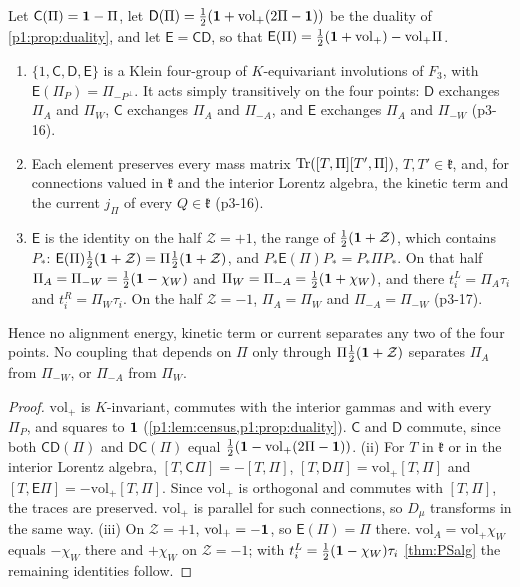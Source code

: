 \begin{proposition}
\label{p3:prop:klein}
Let $\mathsf C(\Pi)=\mathbf 1-\Pi$, let $\mathsf D(\Pi)=\tfrac12(\mathbf 1+\mathrm{vol}_+(2\Pi-\mathbf 1))$ be the duality of \cref{p1:prop:duality}, and let $\mathsf E=\mathsf C\mathsf D$, so
that $\mathsf E(\Pi)=\tfrac12(\mathbf 1+\mathrm{vol}_+)-\mathrm{vol}_+\Pi$.
\begin{enumerate}[label=(\roman*),leftmargin=2.2em]
\item $\{1,\mathsf C,\mathsf D,\mathsf E\}$ is a Klein four-group of $K$-equivariant involutions of $F_3$, with $\mathsf E(\Pi_P)=\Pi_{-P^\perp}$. It acts simply transitively on
the four points: $\mathsf D$ exchanges $\Pi_A$ and $\Pi_W$, $\mathsf C$ exchanges $\Pi_A$ and $\Pi_{-A}$, and $\mathsf E$ exchanges $\Pi_A$ and $\Pi_{-W}$ (p3-16).
\item Each element preserves every mass matrix $\operatorname{Tr}([T,\Pi][T',\Pi])$, $T,T'\in\mathfrak k$, and, for connections valued in $\mathfrak k$ and the interior Lorentz algebra, the
kinetic term and the current $j_\Pi$ of every $Q\in\mathfrak k$ (p3-16).
\item $\mathsf E$ is the identity on the half $\mathcal Z=+1$, the range of $\tfrac12(\mathbf 1+\mathcal Z)$, which contains $P_*$: $\mathsf E(\Pi)\tfrac12(\mathbf 1+\mathcal Z)=\Pi\tfrac12(\mathbf 1+\mathcal Z)$, and
$P_*\mathsf E(\Pi)P_*=P_*\Pi P_*$. On that half $\Pi_A=\Pi_{-W}=\tfrac12(\mathbf 1-\chi_W)$ and $\Pi_W=\Pi_{-A}=\tfrac12(\mathbf 1+\chi_W)$, and there $t^L_i=\Pi_A\tau_i$ and
$t^R_i=\Pi_W\tau_i$. On the half $\mathcal Z=-1$, $\Pi_A=\Pi_W$ and $\Pi_{-A}=\Pi_{-W}$ (p3-17).
\end{enumerate}
Hence no alignment energy, kinetic term or current separates any two of the four points. No coupling that depends on $\Pi$ only through $\Pi\tfrac12(\mathbf 1+\mathcal Z)$ separates
$\Pi_A$ from $\Pi_{-W}$, or $\Pi_{-A}$ from $\Pi_W$.
\end{proposition}

\begin{proof}
$\mathrm{vol}_+$ is $K$-invariant, commutes with the interior gammas and with every $\Pi_P$, and squares to $\mathbf 1$ (\cref{p1:lem:census,p1:prop:duality}). $\mathsf C$ and
$\mathsf D$ commute, since both $\mathsf C\mathsf D(\Pi)$ and $\mathsf D\mathsf C(\Pi)$ equal $\tfrac12(\mathbf 1-\mathrm{vol}_+(2\Pi-\mathbf 1))$. (ii) For $T$ in $\mathfrak k$ or in the
interior Lorentz algebra, $[T,\mathsf C\Pi]=-[T,\Pi]$, $[T,\mathsf D\Pi]=\mathrm{vol}_+[T,\Pi]$ and $[T,\mathsf E\Pi]=-\mathrm{vol}_+[T,\Pi]$. Since $\mathrm{vol}_+$ is orthogonal and
commutes with $[T,\Pi]$, the traces are preserved. $\mathrm{vol}_+$ is parallel for such connections, so $D_\mu$ transforms in the same way. (iii) On $\mathcal Z=+1$,
$\mathrm{vol}_+=-\mathbf 1$, so $\mathsf E(\Pi)=\Pi$ there. $\mathrm{vol}_A=\mathrm{vol}_+\chi_W$ equals $-\chi_W$ there and $+\chi_W$ on $\mathcal Z=-1$; with
$t^L_i=\tfrac12(\mathbf 1-\chi_W)\tau_i$ \cref{thm:PSalg} the remaining identities follow.
\end{proof}

